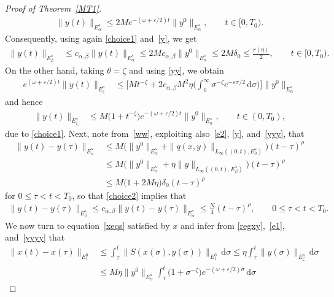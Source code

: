 \documentclass[reqno,11pt]{amsart}
\numberwithin{equation}{section}
\newcommand{\ve}{\varepsilon}
\newcommand{\rd}{\mathrm{d}}
\theoremstyle{remark}
\begin{document}
\begin{proof}[Proof of Theorem~\ref{MT1}]
\begin{align}\label{yy}
 \|y(t)\|_{E_\alpha^s}\le  2 M e^{-(\omega+ \ve/2) t} \| y^0\|_{E_\alpha^s}, \qquad t\in [0,T_0).
\end{align}
Consequently, using again \eqref{choice1}  and~\eqref{y}, we get
\begin{align}\label{yyy}
\|y(t)\|_{E_\beta^s} &\le c_{\alpha,\beta} \|y(t)\|_{E_\alpha^s}\le  2 M c_{\alpha,\beta} \| y^0\|_{E_\alpha^s}\le 2M\delta_0\le \frac{r(\eta)}{2} ,\qquad t\in [0,T_0).
\end{align}
On the other hand, taking $\theta=\zeta$ and using \eqref{yy}, we  obtain
\begin{align*}
e^{(\omega+ \ve/2) t}\|y(t)\|_{E_{\zeta}^s}&\le \Big[M t^{-\zeta}  + 2 c_{\alpha,\beta} M^2 \eta    \Big(\int_0^\infty \sigma^{-\zeta} e^{-\ve \sigma/2}\,\rd \sigma\Big)\Big]\| y^0\|_{E_\alpha^s}
\end{align*}
and hence
\begin{align}\label{yyyy}
\|y(t)\|_{E_{\zeta}^s}&\le M\big(1+t^{-\zeta}\big)e^{-(\omega+ \ve/2) t} \| y^0\|_{E_\alpha^s} ,\qquad t\in (0,T_0),
\end{align}
due to \eqref{choice1}. Next, note from~\eqref{ww},  exploiting also~\eqref{e2},  \eqref{y}, and~\eqref{yyy}, that
\begin{align*}
\|y(t)-y(\tau)\|_{E_{\bar\alpha}^s} & \le M\big(\|y^0\|_{E_{\alpha}^s}+\|q(x,y)\|_{L_\infty((0,t),E_0^s)}\big)(t-\tau)^{\rho}\\
&\le  M\big(\|y^0\|_{E_{\alpha}^s}+\eta\|y\|_{L_\infty((0,t),E_\beta^s)}\big)(t-\tau)^{\rho}\\
&\le  M\big(1+2M\eta\big)\delta_0 (t-\tau)^{\rho}
\end{align*}
for $0\le \tau< t< T_0$, so that \eqref{choice2} implies that
\begin{align}\label{y5}
\|y(t)-y(\tau)\|_{E_{\beta}^s}\le c_{\bar\alpha,\beta}\|y(t)-y(\tau)\|_{E_{\bar\alpha}^s} \le \frac{N}{4} (t-\tau)^{\rho}, \qquad 0\le \tau< t< T_0.
\end{align}
We  now turn to equation~\eqref{xeqs} satisfied by $x$  and infer from \eqref{regxy},~\eqref{e1}, and~\eqref{yyyy}  that
\begin{equation}\label{xxx}
\begin{aligned}
\|x(t)-x(\tau)\|_{E_1^0}&\le \int_\tau^t \|S(x(\sigma),y(\sigma))\|_{E_1^0}\,\rd \sigma \le \eta\int_\tau^t \|y(\sigma)\|_{E_\zeta^s}\,\rd \sigma \\
&\le   M\eta \| y^0\|_{E_\alpha^s} \int_\tau^t \big(1+\sigma^{-\zeta}\big)e^{-(\omega +\ve/2)\sigma} \,\rd \sigma

\end{aligned}
\end{equation}
\end{proof}
\end{document}
